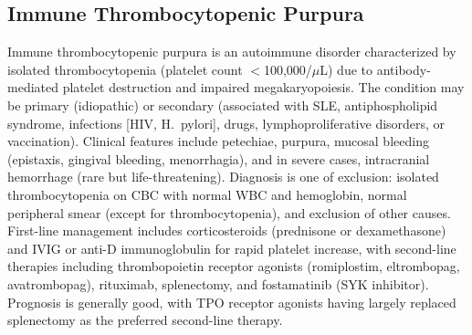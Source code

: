 \subsection{Immune Thrombocytopenic Purpura}
\label{sec:Immune Thrombocytopenic Purpura}
Immune thrombocytopenic purpura is an autoimmune disorder characterized by isolated thrombocytopenia (platelet count $<$100,000/$\mu$L) due to antibody-mediated platelet destruction and impaired megakaryopoiesis. The condition may be primary (idiopathic) or secondary (associated with SLE, antiphospholipid syndrome, infections [HIV, H.~pylori], drugs, lymphoproliferative disorders, or vaccination). Clinical features include petechiae, purpura, mucosal bleeding (epistaxis, gingival bleeding, menorrhagia), and in severe cases, intracranial hemorrhage (rare but life-threatening). Diagnosis is one of exclusion: isolated thrombocytopenia on CBC with normal WBC and hemoglobin, normal peripheral smear (except for thrombocytopenia), and exclusion of other causes. First-line management includes corticosteroids (prednisone or dexamethasone) and IVIG or anti-D immunoglobulin for rapid platelet increase, with second-line therapies including thrombopoietin receptor agonists (romiplostim, eltrombopag, avatrombopag), rituximab, splenectomy, and fostamatinib (SYK inhibitor). Prognosis is generally good, with TPO receptor agonists having largely replaced splenectomy as the preferred second-line therapy.

